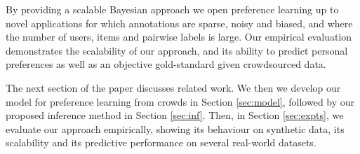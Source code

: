 By providing a scalable Bayesian approach we open preference learning up to novel applications
for which annotations are sparse, noisy and biased, and where the number of users, items and pairwise labels is large.
Our empirical evaluation demonstrates the scalability of our approach,
and its ability to predict personal preferences as well as an objective gold-standard given crowdsourced data.

The next section of the paper discusses related work.
We then we develop our model for preference learning from crowds in Section \ref{sec:model},
followed by our proposed inference method in Section \ref{sec:inf}.
Then, in Section \ref{sec:expts}, 
we evaluate our approach empirically, showing its behaviour on synthetic data, 
its scalability and its predictive performance on several real-world datasets.
